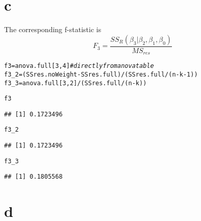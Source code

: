 \documentclass{article}\usepackage[]{graphicx}\usepackage[]{color}
\makeatletter
\newcommand{\hlnum}[1]{\textcolor[rgb]{0.686,0.059,0.569}{#1}}%
\newcommand{\hlcom}[1]{\textcolor[rgb]{0.678,0.584,0.686}{\textit{#1}}}%
\newcommand{\hlopt}[1]{\textcolor[rgb]{0,0,0}{#1}}%
\newcommand{\hlstd}[1]{\textcolor[rgb]{0.345,0.345,0.345}{#1}}%
\newcommand{\hlkwb}[1]{\textcolor[rgb]{0.69,0.353,0.396}{#1}}%
\newenvironment{kframe}{%
 \def\at@end@of@kframe{}%
 \ifinner\ifhmode%
  \def\at@end@of@kframe{\end{minipage}}%
  \begin{minipage}{\columnwidth}%
 \fi\fi%
 \def\FrameCommand##1{\hskip\@totalleftmargin \hskip-\fboxsep
 \colorbox{shadecolor}{##1}\hskip-\fboxsep
     \hskip-\linewidth \hskip-\@totalleftmargin \hskip\columnwidth}%
 \MakeFramed {\advance\hsize-\width
   \@totalleftmargin\z@ \linewidth\hsize
   \@setminipage}}%
 {\par\unskip\endMakeFramed%
 \at@end@of@kframe}
\newenvironment{knitrout}{}{} %
\makeatother
\begin{document}
\clearpage

\section*{c}

The corresponding f-statistic is 
\begin{equation}
F_3 = \frac{SS_R (\beta_3 \vert \beta_2,\beta_1,\beta_0)}{MS_{res}}
\end{equation}

\begin{knitrout}
\color{fgcolor}\begin{kframe}
\begin{alltt}
\hlstd{f3} \hlkwb{=} \hlstd{anova.full[}\hlnum{3}\hlstd{,}\hlnum{4}\hlstd{]} \hlcom{#directly from anova table}
\hlstd{f3_2} \hlkwb{=} \hlstd{(SSres.noWeight} \hlopt{-} \hlstd{SSres.full)}\hlopt{/}\hlstd{(SSres.full} \hlopt{/} \hlstd{(n}\hlopt{-}\hlstd{k}\hlopt{-}\hlnum{1}\hlstd{))}
\hlstd{f3_3} \hlkwb{=} \hlstd{anova.full[}\hlnum{3}\hlstd{,}\hlnum{2}\hlstd{]}\hlopt{/}\hlstd{(SSres.full} \hlopt{/} \hlstd{(n}\hlopt{-}\hlstd{k))}

\hlstd{f3}
\end{alltt}
\begin{verbatim}
## [1] 0.1723496
\end{verbatim}
\begin{alltt}
\hlstd{f3_2}
\end{alltt}
\begin{verbatim}
## [1] 0.1723496
\end{verbatim}
\begin{alltt}
\hlstd{f3_3}
\end{alltt}
\begin{verbatim}
## [1] 0.1805568
\end{verbatim}
\end{kframe}
\end{knitrout}


\clearpage

\section*{d}
\end{document}
